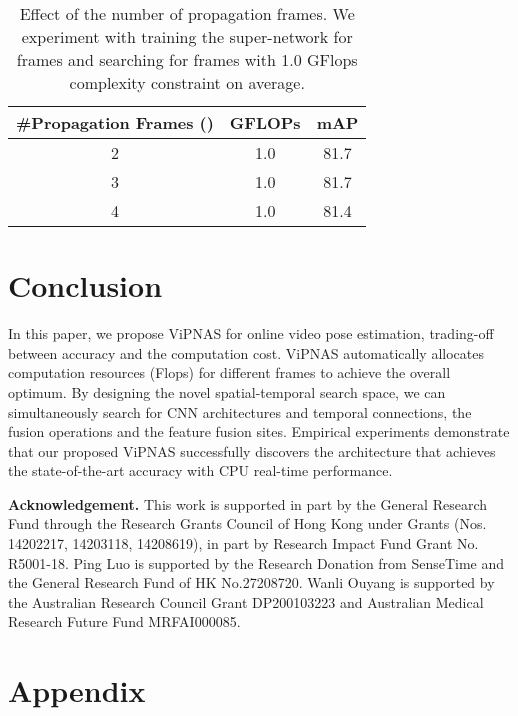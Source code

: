 \documentclass[final]{cvpr}
\begin{document}
\begin{table}[tb]
	\begin{center}
	\caption{Effect of the number of propagation frames. We experiment with training the super-network for  frames and searching for  frames with 1.0 GFlops complexity constraint on average.}
		\begin{tabular}{c|c|c}
			\hline
			\#Propagation Frames () & GFLOPs & mAP   \\\hline
			2  & 1.0 & 81.7 \\ 
			3  & 1.0 & 81.7 \\ 
			4  & 1.0 & 81.4 \\ \hline
		\end{tabular}
	\label{tab:propagation_number}
	\end{center}
	\vspace{-20pt}
\end{table}


\section{Conclusion}

In this paper, we propose ViPNAS for online video pose estimation, trading-off between accuracy and the computation cost. ViPNAS automatically allocates computation resources (\ie Flops) for different frames to achieve the overall optimum. By designing the novel spatial-temporal search space, we can simultaneously search for CNN architectures and temporal connections, \ie the fusion operations and the feature fusion sites. Empirical experiments demonstrate that our proposed ViPNAS successfully discovers the architecture that achieves the state-of-the-art accuracy with CPU real-time performance.


\textbf{Acknowledgement.} This work is supported in part by the General Research Fund through the Research Grants Council of Hong Kong under Grants (Nos. 14202217, 14203118, 14208619), in part by Research Impact Fund Grant No. R5001-18. Ping Luo is supported by the Research Donation from SenseTime and the General Research Fund of HK No.27208720. Wanli Ouyang is supported by the Australian Research Council Grant DP200103223 and Australian Medical Research Future Fund MRFAI000085.

{\small


}


\appendix
\section*{\Large Appendix}
\setcounter{table}{0}
\renewcommand{\thetable}{A\arabic{table}}
\setcounter{figure}{0}
\renewcommand{\thefigure}{A\arabic{figure}}
\end{document}
